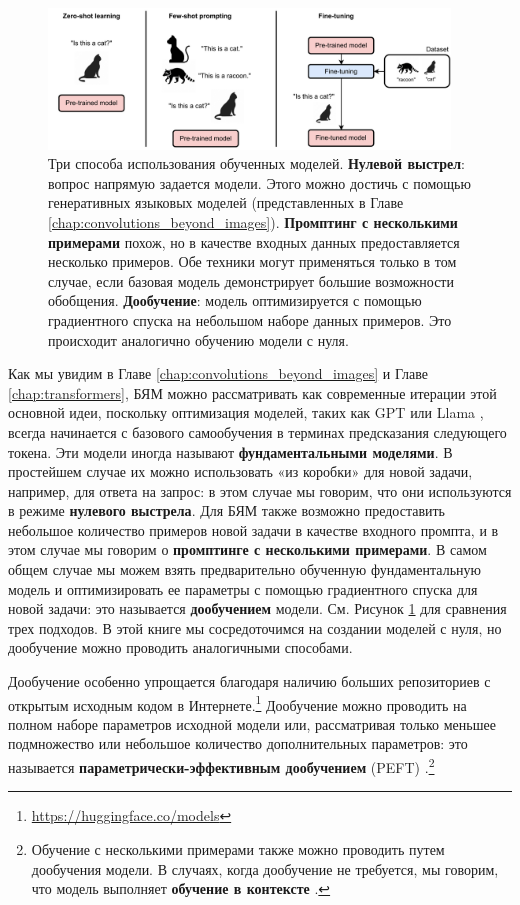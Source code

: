 \begin{figure}[t]
    \centering
    \includegraphics[width=0.95\textwidth]{images/using_models.pdf}
    \caption{Три способа использования обученных моделей. \textbf{Нулевой выстрел}: вопрос напрямую задается модели. Этого можно достичь с помощью генеративных языковых моделей (представленных в Главе \ref{chap:convolutions_beyond_images}). \textbf{Промптинг с несколькими примерами} похож, но в качестве входных данных предоставляется несколько примеров. Обе техники могут применяться только в том случае, если базовая модель демонстрирует большие возможности обобщения. \textbf{Дообучение}: модель оптимизируется с помощью градиентного спуска на небольшом наборе данных примеров. Это происходит аналогично обучению модели с нуля.}
    \label{fig:using_models}
\end{figure}

Как мы увидим в Главе \ref{chap:convolutions_beyond_images} и Главе \ref{chap:transformers}, БЯМ можно рассматривать как современные итерации этой основной идеи, поскольку оптимизация моделей, таких как GPT или Llama \cite{touvron2023llama}, всегда начинается с базового самообучения в терминах предсказания следующего токена. Эти модели иногда называют \textbf{фундаментальными моделями}. В простейшем случае их можно использовать «из коробки» для новой задачи, например, для ответа на запрос: в этом случае мы говорим, что они используются в режиме \textbf{нулевого выстрела}. Для БЯМ также возможно предоставить небольшое количество примеров новой задачи в качестве входного промпта, и в этом случае мы говорим о \textbf{промптинге с несколькими примерами}. В самом общем случае мы можем взять предварительно обученную фундаментальную модель и оптимизировать ее параметры с помощью градиентного спуска для новой задачи: это называется \textbf{дообучением} модели. См. Рисунок \ref{fig:using_models} для сравнения трех подходов. В этой книге мы сосредоточимся на создании моделей с нуля, но дообучение можно проводить аналогичными способами.

Дообучение особенно упрощается благодаря наличию больших репозиториев с открытым исходным кодом в Интернете.\footnote{\url{https://huggingface.co/models}} Дообучение можно проводить на полном наборе параметров исходной модели или, рассматривая только меньшее подмножество или небольшое количество дополнительных параметров: это называется \textbf{параметрически-эффективным дообучением} (PEFT) \cite{lialin2023scaling}.\footnote{Обучение с несколькими примерами также можно проводить путем дообучения модели. В случаях, когда дообучение не требуется, мы говорим, что модель выполняет \textbf{обучение в контексте} \cite{akyurek2022learning}.}

